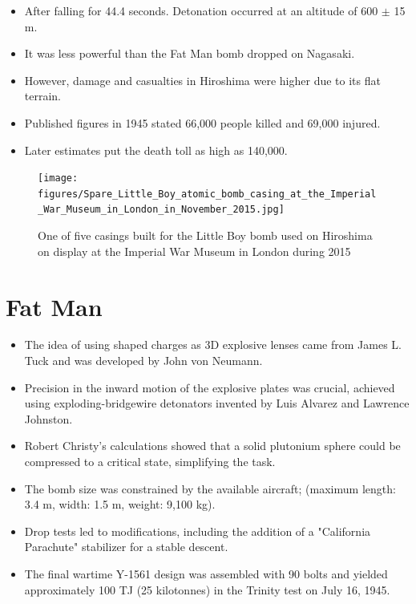 \documentclass{loyola-beamer}
\begin{document}
\begin{frame}
	\begin{itemize}
		\item After falling for 44.4 seconds. Detonation occurred at an altitude of 600 $\pm$ 15 m.
		\item It was less powerful than the Fat Man bomb dropped on Nagasaki.
		\item However, damage and casualties in Hiroshima were higher due to its flat terrain.
		\item Published figures in 1945 stated 66,000 people killed and 69,000 injured.
		\item Later estimates put the death toll as high as 140,000.
	\end{itemize}
\end{frame}

\begin{frame}
	\begin{figure}
		\begin{center}
			\texttt{[image: figures/Spare\_Little\_Boy\_atomic\_bomb\_casing\_at\_the\_Imperial\_War\_Museum\_in\_London\_in\_November\_2015.jpg]}
		\end{center}
		\caption{One of five casings built for the Little Boy bomb used on Hiroshima on display at the Imperial War Museum in London during 2015}
	\end{figure}
\end{frame}

\section{Fat Man}

\begin{frame}
	\begin{itemize}
		\item The idea of using shaped charges as 3D explosive lenses came from James L. Tuck and was developed by John von Neumann.
		\item Precision in the inward motion of the explosive plates was crucial, achieved using exploding-bridgewire detonators invented by Luis Alvarez and Lawrence Johnston.
		\item Robert Christy's calculations showed that a solid plutonium sphere could be compressed to a critical state, simplifying the task.
		\item The bomb size was constrained by the available aircraft; (maximum length: 3.4 m, width: 1.5 m, weight: 9,100 kg).
		\item Drop tests led to modifications, including the addition of a "California Parachute" stabilizer for a stable descent.
		\item The final wartime Y-1561 design was assembled with 90 bolts and yielded approximately 100 TJ (25 kilotonnes) in the Trinity test on July 16, 1945.
	\end{itemize}
\end{frame}
\end{document}
